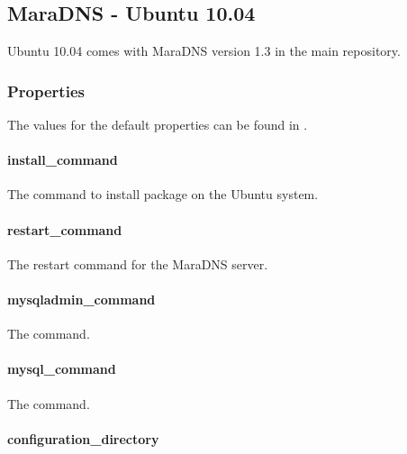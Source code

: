\subsection{MaraDNS - Ubuntu 10.04}

Ubuntu 10.04 comes with MaraDNS version 1.3 in the main repository.

\subsubsection{Properties}

The values for the default properties can be found
in .

\paragraph{install\_command}


The command to install package on the Ubuntu system.

\paragraph{restart\_command}


The restart command for the MaraDNS server.

\paragraph{mysqladmin\_command}


The  command.

\paragraph{mysql\_command}


The  command.

\paragraph{configuration\_directory}

